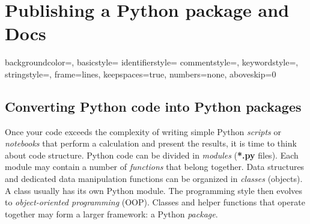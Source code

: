 \section{Publishing a Python package and Docs}
\label{appendix:third}





{
	backgroundcolor=\color{black},
	basicstyle=\footnotesize\color{white}\ttfamily
	identifierstyle=\color{white}
	commentstyle=\color{white},
	keywordstyle=\color{white},
	stringstyle=\color{white},
	frame=lines,
	keepspaces=true,
	numbers=none,
	aboveskip=0\baselineskip
}

\subsection{Converting Python code into Python packages}

Once your code exceeds the complexity of writing simple Python \emph{scripts} or \emph{notebooks} that perform a calculation and present the results, it is time to think about code structure. Python code can be divided in \emph{modules} (\textbf{*.py} files). Each module may contain a number of \emph{functions} that belong together. Data structures and dedicated data manipulation functions can be organized in \emph{classes} (objects). A class usually has its own Python module. The programming style then evolves to \emph{object-oriented programming} (OOP). Classes and helper functions that operate together may form a larger framework: a Python \emph{package}.

